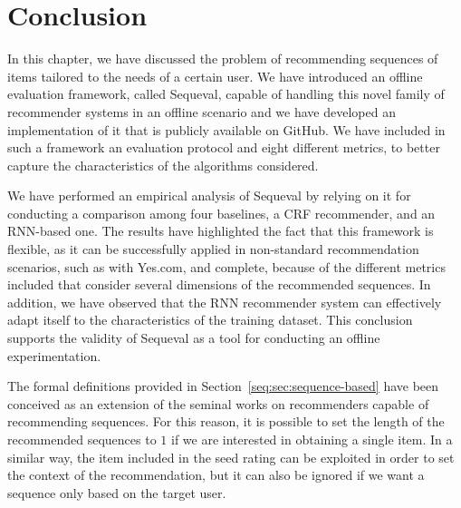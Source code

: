 \section{Conclusion}
\label{seq:sec:conclusion}

In this chapter, we have discussed the problem of recommending sequences of items tailored to the needs of a certain user. We have introduced an offline evaluation framework, called Sequeval, capable of handling this novel family of recommender systems in an offline scenario and we have developed an implementation of it that is publicly available on GitHub. We have included in such a framework an evaluation protocol and eight different metrics, to better capture the characteristics of the algorithms considered.

We have performed an empirical analysis of Sequeval by relying on it for conducting a comparison among four baselines, a CRF recommender, and an RNN-based one. The results have highlighted the fact that this framework is flexible, as it can be successfully applied in non-standard recommendation scenarios, such as with Yes.com, and complete, because of the different metrics included that consider several dimensions of the recommended sequences. In addition, we have observed that the RNN recommender system can effectively adapt itself to the characteristics of the training dataset. This conclusion supports the validity of Sequeval as a tool for conducting an offline experimentation.

The formal definitions provided in Section~\ref{seq:sec:sequence-based} have been conceived as an extension of the seminal works on recommenders capable of recommending sequences. For this reason, it is possible to set the length of the recommended sequences to $1$ if we are interested in obtaining a single item. In a similar way, the item included in the seed rating can be exploited in order to set the context of the recommendation, but it can also be ignored if we want a sequence only based on the target user.
